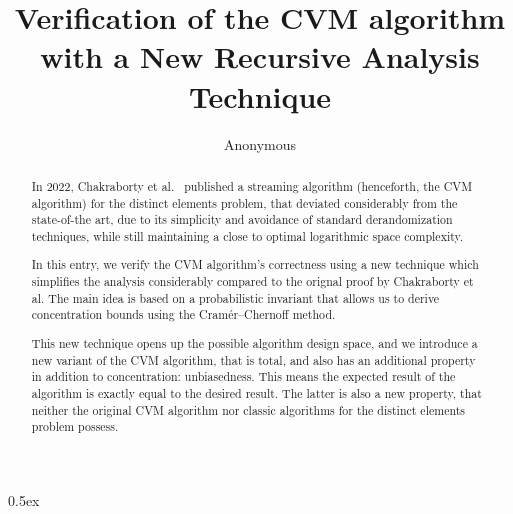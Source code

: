 \documentclass[11pt,a4paper]{article}
\theoremstyle{definition}
\begin{document}
\title{Verification of the CVM algorithm with a New Recursive Analysis Technique}
\author{Anonymous}
\maketitle

\begin{abstract}
In 2022, Chakraborty et al.~\cite{chakraborty2022} published a streaming
algorithm (henceforth, the CVM algorithm) for the distinct
elements problem, that deviated considerably from the state-of-the art, due to its simplicity
and avoidance of standard derandomization techniques, while still maintaining a close to optimal
logarithmic space complexity.

In this entry, we verify the CVM algorithm's correctness using a new technique which simplifies
the analysis considerably compared to the orignal proof by Chakraborty et al. The main idea is
based on a probabilistic invariant that allows us to derive concentration bounds using the
Cram\'{e}r--Chernoff method.

This new technique opens up the possible algorithm design space, and we introduce a new variant of
the CVM algorithm, that is total, and also has an additional property in addition to concentration:
unbiasedness. This means the expected result of the algorithm is exactly equal to the desired
result. The latter is also a new property, that neither the original CVM algorithm nor classic
algorithms for the distinct elements problem possess.
\end{abstract}

\tableofcontents

\parindent 0pt\parskip 0.5ex






\appendix

\end{document}
